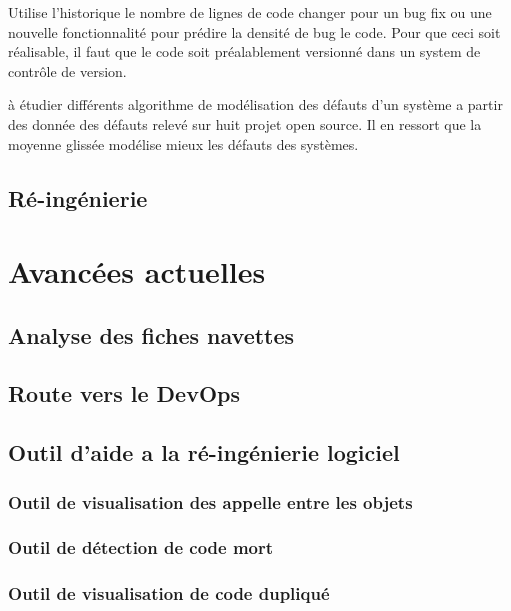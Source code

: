 \documentclass[a4paper]{article}
\begin{document}
\citep{naga05} Utilise l'historique le nombre de lignes de code changer pour un bug fix ou une nouvelle fonctionnalité pour prédire la densité de bug  le code. Pour que ceci soit réalisable, il faut que le code soit préalablement versionné dans un system de contrôle de version.

\citep{Raja09} à étudier différents algorithme de modélisation des défauts d'un système a partir des donnée des défauts relevé sur huit projet open source. Il en ressort que la moyenne glissée modélise mieux les défauts des systèmes.

 
\subsection{Ré-ingénierie}
\label{sec:reingenierie}


\section{Avancées actuelles}

\subsection{Analyse des fiches navettes}
\label{sec:analyseDesFichesNavettes}

\subsection{Route vers le DevOps}
\label{sec: devOps}

\subsection{Outil d'aide a la ré-ingénierie logiciel}

\subsubsection{Outil de visualisation des appelle entre les objets }

\subsubsection{Outil de détection de code mort}

\subsubsection{Outil de visualisation de code dupliqué}
\end{document}

